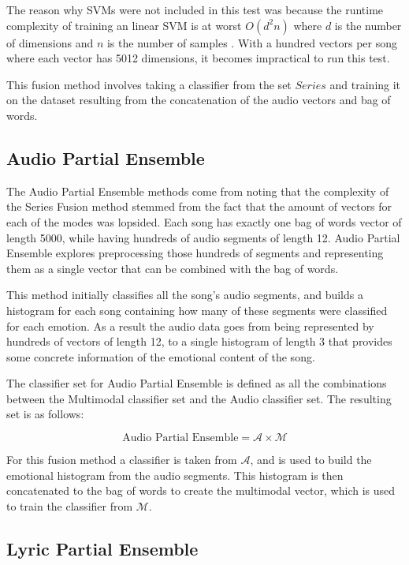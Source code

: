 The reason why SVMs were not included in this test was because 
the runtime complexity of training an linear SVM is at worst $O(d^2n)$ where $d$ is the number of dimensions and $n$ is the number of samples \cite{chapelle2007training}. 
With a hundred vectors per song where each vector has 5012 dimensions, it becomes impractical to run this test.

This fusion method involves taking a classifier from the set $Series$ and training it on the dataset resulting from the concatenation 
of the audio vectors and bag of words.  

\subsection*{Audio Partial Ensemble}

The Audio Partial Ensemble methods come from noting that the complexity of the Series Fusion method stemmed from the 
fact that the amount of vectors for each of the modes was lopsided. Each song has exactly one bag of words vector of length 5000, while 
having hundreds of audio segments of length 12. Audio Partial Ensemble explores preprocessing those hundreds of segments and representing them as a single
vector that can be combined with the bag of words. 

This method initially classifies all the song's audio segments, and builds a histogram
for each song containing how many of these segments were classified for each emotion. 
As a result the audio data goes from being represented by hundreds of
vectors of length 12, to a single histogram of length 3 that provides some concrete information of the emotional content of the song. 

The classifier set for Audio Partial Ensemble is defined as all the combinations between the Multimodal classifier set and the Audio classifier set.  The resulting 
set is as follows: 

\[ \text{Audio Partial Ensemble} = \mathcal{A} \times \mathcal{M}   \]

For this fusion method a classifier is taken from $\mathcal{A}$, and is used to build the emotional histogram from the audio segments. This 
histogram is then concatenated to the bag of words to create the multimodal vector, which is used to train the classifier from $\mathcal{M}$.


\subsection*{Lyric Partial Ensemble}

